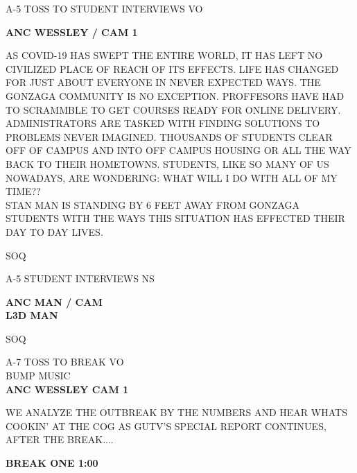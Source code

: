 \documentclass{article}
\newenvironment{changemargin}[2]{%
\begin{list}{}{%
\setlength{\topsep}{0pt}%
\setlength{\leftmargin}{#1}%
\setlength{\rightmargin}{#2}%
\setlength{\listparindent}{\parindent}%
\setlength{\itemindent}{\parindent}%
\setlength{\parsep}{\parskip}%
}%
\item[]}{\end{list}}
\begin{document}
\begin{flushleft}
\begin{changemargin}{-3cm}{-5cm}
\end{changemargin}
\vspace{8.5mm}

\begin{changemargin}{-3cm}{-5cm}
\color{red}
A-5     TOSS TO STUDENT INTERVIEWS VO

\color{black}

\textbf{
ANC WESSLEY / CAM 1}
\end{changemargin}


\begin{changemargin}{4cm}{1cm}
AS COVID-19 HAS SWEPT THE ENTIRE WORLD, IT HAS LEFT NO CIVILIZED PLACE OF REACH OF ITS EFFECTS. LIFE HAS CHANGED FOR JUST ABOUT EVERYONE IN NEVER EXPECTED WAYS. THE GONZAGA COMMUNITY IS NO EXCEPTION. PROFFESORS HAVE HAD TO SCRAMMBLE TO GET COURSES READY FOR ONLINE DELIVERY. ADMINISTRATORS ARE TASKED WITH FINDING SOLUTIONS TO PROBLEMS NEVER IMAGINED. THOUSANDS OF STUDENTS CLEAR OFF OF CAMPUS AND INTO OFF CAMPUS HOUSING OR ALL THE WAY BACK TO THEIR HOMETOWNS. STUDENTS, LIKE SO MANY OF US NOWADAYS, ARE WONDERING: WHAT WILL I DO WITH ALL OF MY TIME?? \\

STAN MAN IS STANDING BY 6 FEET AWAY FROM GONZAGA STUDENTS WITH THE WAYS THIS SITUATION HAS EFFECTED THEIR DAY TO DAY LIVES.
\end{changemargin}

\begin{changemargin}{-3cm}{-5cm}
\color{red}
SOQ

\end{changemargin}

\begin{changemargin}{-3cm}{-5cm}
\color{red}
A-5     STUDENT INTERVIEWS NS

\color{black}

\textbf{
ANC MAN / CAM} \\
\textbf{
L3D MAN}

\color{red}
SOQ

\vspace{25mm}
A-7 TOSS TO BREAK VO \\
BUMP MUSIC \\
\color{black}
\textbf{ANC WESSLEY CAM 1}
\end{changemargin}

\begin{changemargin}{2cm}{1cm}
WE ANALYZE THE OUTBREAK BY THE NUMBERS AND HEAR WHATS COOKIN' AT THE COG AS GUTV'S SPECIAL REPORT CONTINUES, AFTER THE BREAK....
\end{changemargin}

\begin{changemargin}{4cm}{1cm}
\color{blue}
\textbf{BREAK ONE 1:00}
\end{changemargin}











\end{flushleft}
\end{document}
